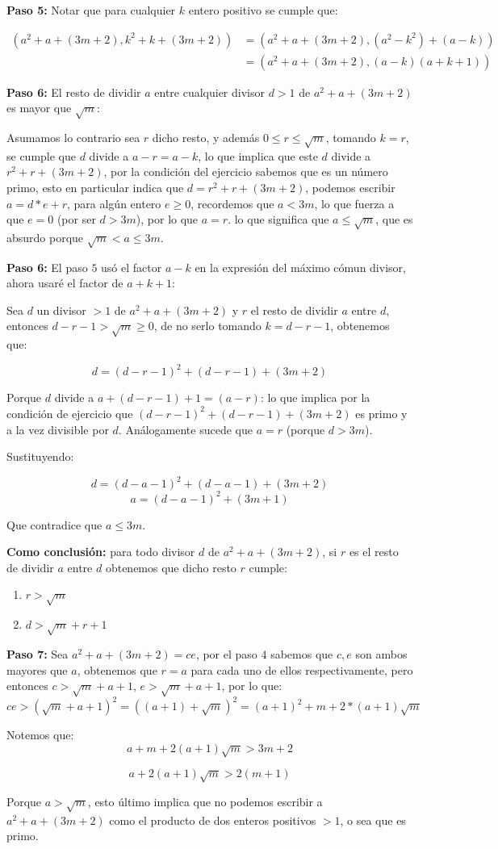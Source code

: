 \documentclass[14pt]{extarticle}
\begin{document}
\textbf{Paso 5:}
Notar que para cualquier $k$ entero positivo se cumple que:

\begin{align}
    \left( a^2+a+(3m+2), k^2+k+(3m+2)    \right) &= \left( a^2+a+(3m+2), (a^2-k^2)+(a-k) \right)  \\
    &= \left( a^2+a+(3m+2), (a-k)(a+k+1) \right) 
\end{align}

\textbf{Paso 6:} El resto de dividir $a$ entre cualquier divisor $d > 1$ de $a^2+a+(3m+2)$ es mayor que $\sqrt{m}$:

Asumamos lo contrario sea $r$ dicho resto, y además $0 \leq r \leq \sqrt{m}$, tomando $k = r$, se cumple que $d$ divide a $a-r = a-k$, lo que implica que este $d$ divide a $r^2+r+(3m+2)$, por la condición del ejercicio sabemos que es un número primo, esto en particular indica que $d = r^2+r+(3m+2)$, podemos escribir $a = d*e +r$, para algún entero $e \geq 0$, recordemos que $a < 3m$, lo que fuerza a que $e = 0$ (por ser $d > 3m$), por lo que $a = r$. lo que significa que $a \leq \sqrt{m}$, que es absurdo porque $\sqrt{m} < a \leq 3m$.

\textbf{Paso 6:} El paso $5$ usó el factor $a-k$ en la expresión del máximo cómun divisor, ahora usaré el factor de $a+k+1$:

Sea $d$ un divisor $>1$ de $a^2+a+(3m+2)$ y $r$ el resto de dividir $a$ entre $d$, entonces $d-r -1 > \sqrt{m} \geq 0$, de no serlo tomando $k = d-r-1$, obtenemos que:

$$d = (d-r-1)^2 + (d-r-1) + (3m+2)$$

Porque $d$ divide a $a+(d-r-1) + 1 = (a-r)$: lo que implica por la condición de ejercicio que $(d-r-1)^2 + (d-r-1) + (3m+2)$ es primo y a la vez divisible por $d$. Análogamente sucede que $a = r$ (porque $d > 3m$).

Sustituyendo:

$$d = (d-a-1)^2 + (d-a-1) + (3m+2)$$
$$a = (d-a-1)^2 + (3m+1)$$

Que contradice que $a \leq 3m$. 

\textbf{Como conclusión:} para todo divisor $d$ de $a^2+a+(3m+2)$, si $r$ es el resto de dividir $a$ entre $d$ obtenemos que dicho resto $r$ cumple:

\begin{enumerate}
    \item $r > \sqrt{m}$
    \item $d > \sqrt{m} + r + 1$
\end{enumerate}

\textbf{Paso 7:} Sea $a^2+a+(3m+2) = ce$, por el paso $4$ sabemos que  $c,e$ son ambos mayores que $a$, obtenemos que $r = a$ para cada uno de ellos respectivamente, pero entonces $c > \sqrt{m}+a+1$, $e > \sqrt{m}+a+1$, por lo que: $$ce > (\sqrt{m}+a+1)^2 = ((a+1)+ \sqrt{m})^2 = (a+1)^2+m + 2*(a+1)\sqrt{m}$$

Notemos que:
$$
a+m+2(a+1)\sqrt{m} > 3m+2
$$

$$
a+2(a+1)\sqrt{m} > 2(m+1)
$$

Porque $a > \sqrt{m}$, esto último implica que no podemos escribir a $a^2+a+(3m+2)$ como el producto de dos enteros positivos $>1$, o sea que es primo.
\end{document}
